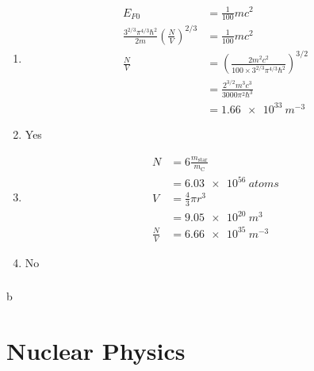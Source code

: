 \documentclass{article}
\begin{document}
\begin{enumerate}
  \item

        \begin{align*}
          E_{F 0}                                                                      & = \frac{1}{100} m c^2                                                               \\
          \frac{3^{2 / 3} \pi^{4 / 3} \hbar^2}{2 m} \left( \frac{N}{V} \right)^{2 / 3} & = \frac{1}{100} m c^2                                                               \\
          \frac{N}{V}                                                                  & = \left( \frac{2 m^2 c^2}{100 \times 3^{2 / 3} \pi^{4 / 3} \hbar^2} \right)^{3 / 2} \\
                                                                                       & = \frac{2^{3 / 2} m^3 c^3}{3000 \pi^2 \hbar^3}                                      \\
                                                                                       & = \qty{1.66e33}{m^{-3}}
        \end{align*}

  \item Yes

  \item

        \begin{align*}
          N           & = 6 \frac{m_\text{star}}{m_\text{C}} \\
                      & = \qty{6.03e56}{atoms}               \\
          V           & = \frac{4}{3} \pi r^3                \\
                      & = \qty{9.05e20}{m^3}                 \\
          \frac{N}{V} & = \qty{6.66e35}{m^{-3}}
        \end{align*}

  \item No
\end{enumerate}

\setcounter{subsubsection}{56}
\subsubsection{}

b

\section{Nuclear Physics}
\end{document}
